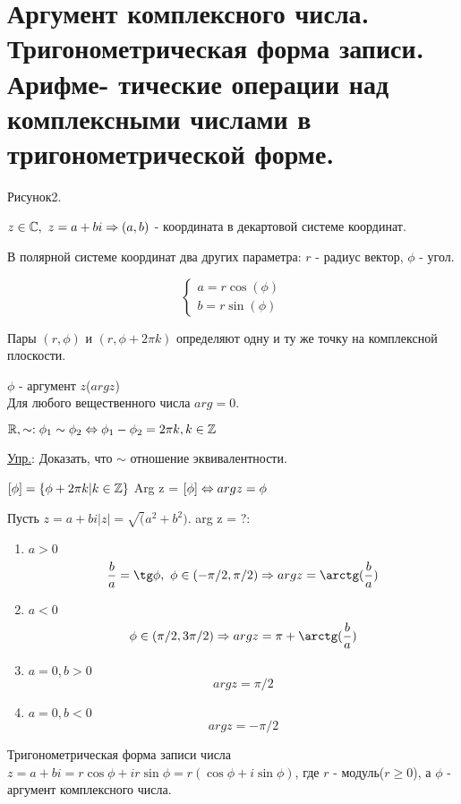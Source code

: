 \section{Аргумент комплексного числа. Тригонометрическая форма записи. Арифме-
тические операции над комплексными числами в тригонометрической форме.}

Рисунок2.

$z \in \mathbb{C},~z = a + bi \Rightarrow (a, b)$ - координата в декартовой системе координат.

В полярной системе координат два других параметра: $r$ - радиус вектор, $\phi$ - угол.

$$
\begin{cases}
	a = r\cos(\phi) \\
	b = r\sin(\phi)
\end{cases}
$$  

Пары $(r, \phi)$ и $(r, \phi + 2 \pi k)$ определяют одну и ту же точку на комплексной плоскости.

\begin{Def}
	$\phi$ - аргумент $z$($arg z$) \\
	\hspace*{1cm}Для любого вещественного числа $arg = 0$.
\end{Def}

$\mathbb{R}, \sim: \phi_1 \sim \phi_2 \Leftrightarrow \phi_1 - \phi_2 = 2 \pi k, k\in \mathbb{Z}$

\underline{Упр.}: Доказать, что $\sim$ отношение эквивалентности.

\begin{Def}
	$[\phi] = \{\phi + 2 \pi k | k \in \mathbb{Z}\}$
	\hspace*{1cm}Arg z = $[\phi] \Leftrightarrow arg z = \phi$
\end{Def}

Пусть $z = a + bi |z| = \sqrt(a^2 + b^2)$. arg z = ?: \\
\begin{enumerate}
	\item $a > 0$ 
	$$ \frac{b}{a} = \tg \phi,~\phi \in (-\pi/2, \pi/2) \Ra arg z = \arctg(\frac{b}{a}) $$
	\item $a < 0$ 
	$$ \phi \in (\pi/2, 3 \pi/2) \Ra arg z = \pi + \arctg(\frac{b}{a}) $$
	\item $a = 0, b > 0$
	$$ arg z = \pi/2$$
	\item $a = 0, b < 0$
	$$ arg z = -\pi/2$$
\end{enumerate}

\begin{Def}{Тригонометрическая форма записи числа} \\
\hspace*{1cm}$z = a + bi = r\cos \phi + ir \sin \phi = r(\cos \phi + i \sin \phi)$, где $r$ - модуль($r \ge 0$), а $\phi$ - аргумент комплексного числа.
\end{Def}

